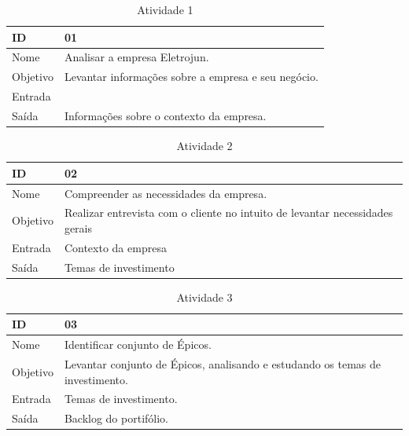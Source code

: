 \begin{table}[\htp]
\centering
\caption{Atividade 1}
\label{my-label}
\begin{tabular}{|l|l|}
\hline
ID       & 01                                                  \\ \hline
Nome     & Analisar a empresa Eletrojun.                       \\ \hline
Objetivo & Levantar informações sobre a empresa e seu negócio. \\ \hline
Entrada  &                                                     \\ \hline
Saída    & Informações sobre o contexto da empresa.            \\ \hline
\end{tabular}
\end{table}

\begin{table}[\htp]
\centering
\caption{Atividade 2}
\label{my-label}
\begin{tabular}{|l|l|}
\hline
ID       & 02                                                  \\ \hline
Nome     & Compreender as necessidades da empresa. \\ \hline
Objetivo & Realizar entrevista com o cliente no intuito de levantar necessidades gerais \\ \hline
Entrada  &  Contexto da empresa \\ \hline
Saída    & Temas de investimento \\ \hline
\end{tabular}
\end{table}

\begin{table}[\htp]
\centering
\caption{Atividade 3}
\label{my-label}
\begin{tabular}{|l|l|}
\hline
ID       & 03                                                 \\ \hline
Nome     & Identificar conjunto de Épicos. \\ \hline
Objetivo & Levantar conjunto de Épicos, analisando e estudando os temas de investimento.
 \\ \hline
Entrada  &  Temas de investimento. \\ \hline
Saída    & Backlog do portifólio.  \\ \hline
\end{tabular}
\end{table}

